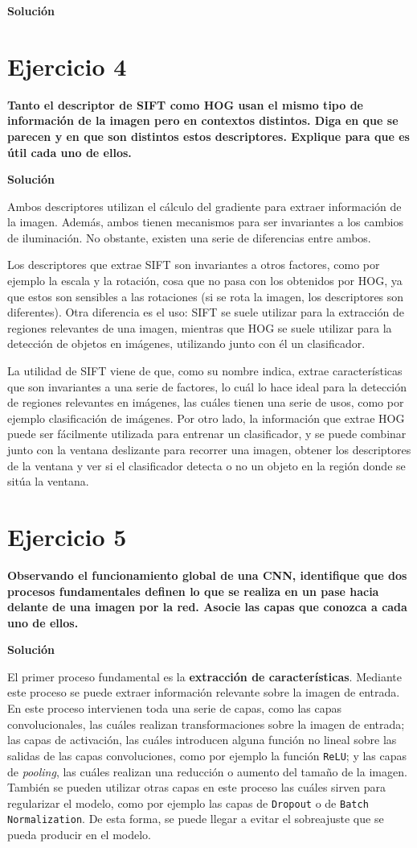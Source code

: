 \documentclass[11pt,a4paper]{article}
\newcommand{\answer}{\noindent\textbf{Solución}}
\newcommand{\question}[1]{\noindent\textbf{#1}}
\newcommand{\nonumsection}[1]{\section*{#1}\addcontentsline{toc}{section}{#1}}
\begin{document}
\answer

\nonumsection{Ejercicio 4}

\question{Tanto el descriptor de SIFT como HOG usan el mismo tipo de
información de la imagen pero en contextos distintos. Diga en que se
parecen y en que son distintos estos descriptores. Explique para que
es útil cada uno de ellos.}

\answer

Ambos descriptores utilizan el cálculo del gradiente para extraer
información de la imagen. Además, ambos tienen mecanismos para ser
invariantes a los cambios de iluminación. No obstante, existen una
serie de diferencias entre ambos.

Los descriptores que extrae SIFT son invariantes a otros factores,
como por ejemplo la escala y la rotación, cosa
que no pasa con los obtenidos por HOG, ya que estos son sensibles a las
rotaciones (si se rota la imagen, los descriptores son diferentes). Otra
diferencia es el uso: SIFT se suele utilizar para la extracción de
regiones relevantes de una imagen, mientras que HOG se suele
utilizar para la detección de objetos en imágenes, utilizando junto con él
un clasificador.

La utilidad de SIFT viene de que, como su nombre indica,
extrae características que son invariantes a una serie de factores, lo cuál
lo hace ideal para la detección de regiones relevantes en imágenes, las
cuáles tienen una serie de usos, como por ejemplo clasificación de imágenes.
Por otro lado, la información que extrae HOG puede ser fácilmente utilizada
para entrenar un clasificador, y se puede combinar junto con la ventana deslizante
para recorrer una imagen, obtener los descriptores de la ventana y ver si
el clasificador detecta o no un objeto en la región donde se sitúa la ventana.


\nonumsection{Ejercicio 5}

\question{Observando el funcionamiento global de una CNN, identifique que
dos procesos fundamentales definen lo que se realiza en un pase hacia
delante de una imagen por la red. Asocie las capas que conozca a cada
uno de ellos.}

\answer

El primer proceso fundamental es la \textbf{extracción de características}.
Mediante este proceso se puede extraer información relevante sobre la imagen
de entrada. En este proceso intervienen toda una serie de capas,
como las capas convolucionales, las cuáles realizan transformaciones sobre
la imagen de entrada; las capas de activación, las cuáles
introducen alguna función no lineal sobre las salidas de las
capas convoluciones, como por ejemplo la función \texttt{ReLU}; y las
capas de \textit{pooling}, las cuáles realizan una reducción o aumento
del tamaño de la imagen. También se pueden utilizar otras capas en este
proceso las cuáles sirven para regularizar el modelo, como por ejemplo las capas
de \texttt{Dropout} o de \texttt{Batch Normalization}. De esta forma, se puede
llegar a evitar el sobreajuste que se pueda producir en el modelo.
\end{document}
